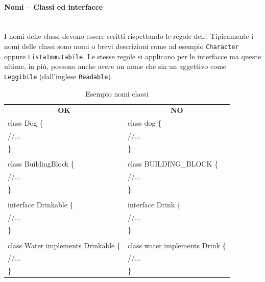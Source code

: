 \paragraph{Nomi – Classi ed interfacce}\mbox{}\\[0.4cm]
I nomi delle classi devono essere scritti rispettando le regole dell’. Tipicamente i nomi delle classi sono nomi o brevi descrizioni come ad esempio \texttt{Character} oppure \texttt{ListaImmutabile}. Le stesse regole si applicano per le interfacce ma queste ultime, in più, possono anche avere un nome che sia un aggettivo come \texttt{Leggibile} (dall’inglese \texttt{Readable}).
\begin{table} [H]
	\begin{center}
		\begin{tabular}{  l | l }
			\multicolumn{1}{c}{\textbf{OK}}&\multicolumn{1}{c}{\textbf{NO}}\\ 
			
			class Dog \{
			& class dog \{ \\
			\hspace{0.5cm}//...
			& \hspace{0.5cm}//... \\
			\}
			& \} \\
			&\\
			class BuildingBlock \{
			& class BUILDING\_BLOCK \{\\
			\hspace{0.5cm}//...
			& \hspace{0.5cm}//...\\
			\}
			&\}\\
			&\\
			interface Drinkable \{
			& interface Drink \{\\
			\hspace{0.5cm}//...
			& \hspace{0.5cm}//...\\
			\}
			& \}\\
			&\\
			class Water implements Drinkable \{
			& class water implements Drink \{ \\
			\hspace{0.5cm}//...									& \hspace{0.5cm}//...\\
			\}
			& \}\\		
		\end{tabular}
	\end{center}
	\caption{Esempio nomi classi}
\end{table}
	
